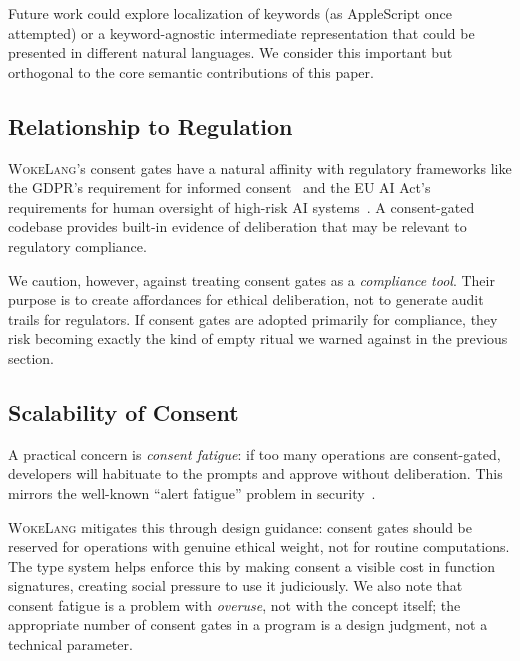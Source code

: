 \documentclass[11pt,a4paper]{article}
\newcommand{\WokeLang}{\textsc{WokeLang}}
\begin{document}
Future work could explore localization of keywords (as
AppleScript once attempted) or a keyword-agnostic intermediate
representation that could be presented in different natural languages.
We consider this important but orthogonal to the core semantic
contributions of this paper.

\subsection{Relationship to Regulation}

\WokeLang{}'s consent gates have a natural affinity with regulatory
frameworks like the GDPR's requirement for informed
consent~\citep{gdpr2016} and the EU AI Act's requirements for
human oversight of high-risk AI
systems~\citep{euaiact2024}.  A consent-gated
codebase provides built-in evidence of deliberation that may be
relevant to regulatory compliance.

We caution, however, against treating consent gates as a
\emph{compliance tool}.  Their purpose is to create affordances for
ethical deliberation, not to generate audit trails for regulators.
If consent gates are adopted primarily for compliance, they risk
becoming exactly the kind of empty ritual we warned against in the
previous section.

\subsection{Scalability of Consent}

A practical concern is \emph{consent fatigue}: if too many operations
are consent-gated, developers will habituate to the prompts and
approve without deliberation.  This mirrors the well-known
``alert fatigue'' problem in
security~\citep{anderson2008security,akhawe2013alice}.

\WokeLang{} mitigates this through design guidance: consent gates
should be reserved for operations with genuine ethical weight, not for
routine computations.  The type system helps enforce this by making
consent a visible cost in function signatures, creating social
pressure to use it judiciously.  We also note that consent fatigue is
a problem with \emph{overuse}, not with the concept itself; the
appropriate number of consent gates in a program is a design judgment,
not a technical parameter.

\end{document}
